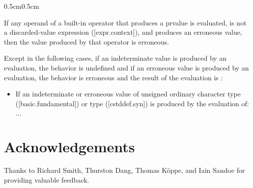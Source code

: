 \begin{adjustwidth}{0.5cm}{0.5cm}
\begin{addedblock}
If any operand of a built-in operator that produces a prvalue is evaluated, is not a discarded-value expression ([expr.context]), and produces an erroneous value, then the value produced by that operator is erroneous.
\end{addedblock}

Except in the following cases, if an indeterminate value is produced by an evaluation,
the behavior is undefined  and if an erroneous value is produced by an evaluation, the behavior is erroneous and
the result of the evaluation is :
\begin{itemize}
\item If an indeterminate or erroneous value of unsigned ordinary character type ([basic.\allowbreak{}fundamental]) or  type ([cstddef.syn]) is produced by the evaluation of:  \\ ...
\end{itemize}
\end{adjustwidth}



\pagebreak %
\section*{Acknowledgements}
Thanks to  Richard Smith, Thurston Dang, Thomas K\"{o}ppe, and Iain Sandoe for providing valuable feedback.


\renewcommand{\bibname}{References}  %







